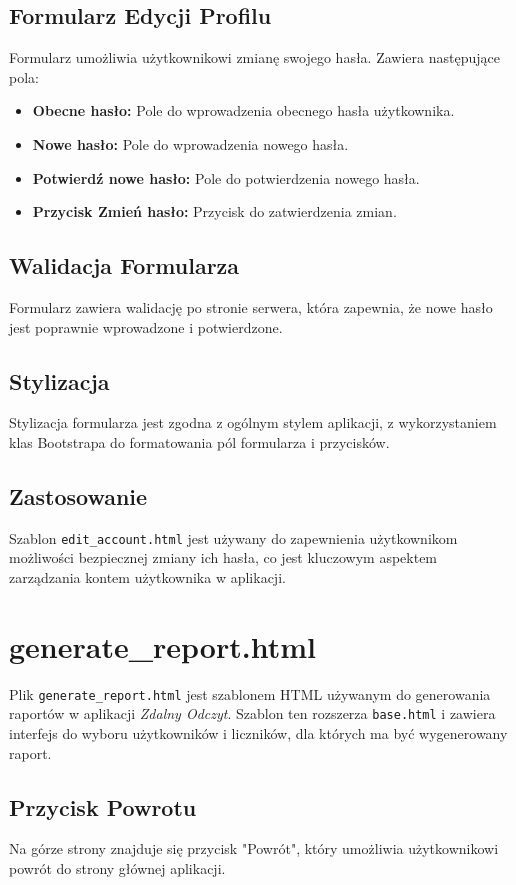 \documentclass[12pt,a4paper]{report}
\begin{document}
\subsection{Formularz Edycji Profilu}
Formularz umożliwia użytkownikowi zmianę swojego hasła. Zawiera następujące pola:
\begin{itemize}
\item \textbf{Obecne hasło:} Pole do wprowadzenia obecnego hasła użytkownika.
\item \textbf{Nowe hasło:} Pole do wprowadzenia nowego hasła.
\item \textbf{Potwierdź nowe hasło:} Pole do potwierdzenia nowego hasła.
\item \textbf{Przycisk Zmień hasło:} Przycisk do zatwierdzenia zmian.
\end{itemize}

\subsection{Walidacja Formularza}
Formularz zawiera walidację po stronie serwera, która zapewnia, że nowe hasło jest poprawnie wprowadzone i potwierdzone.

\subsection{Stylizacja}
Stylizacja formularza jest zgodna z ogólnym stylem aplikacji, z wykorzystaniem klas Bootstrapa do formatowania pól formularza i przycisków.

\subsection{Zastosowanie}
Szablon \texttt{edit\_account.html} jest używany do zapewnienia użytkownikom możliwości bezpiecznej zmiany ich hasła, co jest kluczowym aspektem zarządzania kontem użytkownika w aplikacji.


\section{generate\_report.html}
\label{sec:generatereport}
Plik \texttt{generate\_report.html} jest szablonem HTML używanym do generowania raportów w aplikacji \textit{Zdalny Odczyt}. Szablon ten rozszerza \texttt{base.html} i zawiera interfejs do wyboru użytkowników i liczników, dla których ma być wygenerowany raport.

\subsection{Przycisk Powrotu}
Na górze strony znajduje się przycisk "Powrót", który umożliwia użytkownikowi powrót do strony głównej aplikacji.
\end{document}
